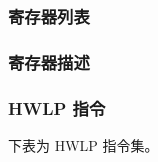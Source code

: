 \documentclass[main\_\_CN.tex]{subfiles}
\begin{document}
\subsubsection{寄存器列表}
\label{sec:riscvcpu-hwloop-reg-summ}



\subsubsection{寄存器描述}
\label{sec:riscvcpu-hwloop-reg-desc}


\clearpage
\begin{landscape}

\subsubsection{HWLP 指令}
\label{sec:riscvcpu-hwloop-instr}
下表为 HWLP 指令集。


\end{landscape}
\end{document}
